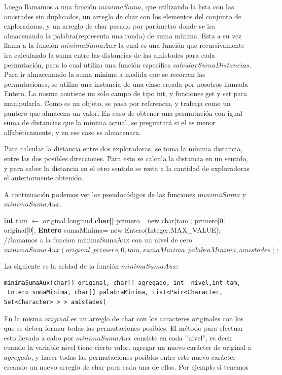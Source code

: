 Luego llamamos a una función $minimaSuma$, que utilizando la lista con las amistades sin duplicados, un arreglo de char con los elementos del conjunto de exploradoras, y un arreglo de char pasado por parámetro donde se ira almacenando la palabra(representa una ronda) de suma mínima. Esta a su vez llama a la función $ minimaSumaAux $ la cual es una función que recursivamente ira calculando la suma entre las distancias de las amistades para cada permutación, para lo cual utiliza una función específica $ calcularSumaDistancias $. Para ir almacenando la suma mínima a medida que se recorren las permutaciones, se utiliza una instancia de una clase creada por nosotros llamada Entero. La misma contiene un solo campo de tipo int, y funciones get y set para manipularla. Como es un objeto, se pasa por referencia, y trabaja como un puntero que almacena un valor.
En caso de obtener una permutación con igual suma de distancias que la mínima actual, se preguntará si el es menor alfabéticamente, y en ese caso se almacenara.

Para calcular la distancia entre dos exploradoras, se toma la mínima distancia, entre las dos posibles direcciones. Para esto se calcula la distancia en un sentido, y para saber la distancia en el otro sentido se resta a la cantidad de exploradoras el anteriormente obtenido.

A continuación podemos ver los pseudocódigos de las funciones $minimaSuma$ y $ minimaSumaAux $.

\begin{codebox}
	\li \textbf{int} tam $ \leftarrow $ original.longitud
	\li \textbf{char[]} primero= new char[tam];
	\li primero[0]= original[0];
	\li \textbf{Entero} sumaMinima= new Entero(Integer.MAX_VALUE);	
	\li //lamamos a la funcion minimaSumaAux con un nivel de cero
	\li $minimaSumaAux(original, primero,0,tam,sumaMinima,palabraMinima, amistades);$
\end{codebox}

 La siguiente es la aridad de la función  $ minimaSumaAux :$ 
 
\begin{verbatim}
minimaSumaAux(char[] original, char[] agregado, int  nivel,int tam,
 Entero sumaMinima, char[] palabraMinima, List<Pair<Character, Set<Character> > > amistades)
\end{verbatim}
 
En la misma $original $ es un arreglo de char con los caracteres originales con los que se deben formar todas las permutaciones posibles. El método para efectuar esto llevado a cabo por $minimaSumaAux$ consiste en cada ''nivel'', es decir cuando la variable nivel tiene cierto valor, agregar un nuevo carácter de original a $ agregado $, y hacer todas las permutaciones posibles entre este nuevo carácter creando un nuevo arreglo de char para cada una de ellas. Por ejemplo si tenemos 

